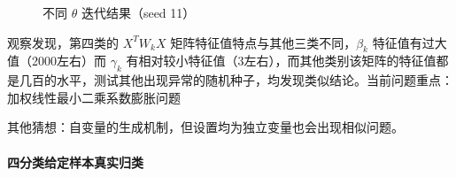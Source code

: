 \documentclass[12pt, a4paper, oneside]{article}
\numberwithin{equation}{section}
\begin{document}
\begin{figure}
%
%
	\caption{不同 $\theta$ 迭代结果（seed 11）}
	\label{fig:theta_res}
\end{figure}



观察发现，第四类的 $X^T W_k X$ 矩阵特征值特点与其他三类不同，$\beta_k$ 特征值有过大值（2000左右）而 $\gamma_k$ 有相对较小特征值（3左右），而其他类别该矩阵的特征值都是几百的水平，测试其他出现异常的随机种子，均发现类似结论。当前问题重点：加权线性最小二乘系数膨胀问题


其他猜想：自变量的生成机制，但设置均为独立变量也会出现相似问题。


\clearpage
\paragraph{四分类给定样本真实归类}
\end{document}

